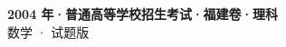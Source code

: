 \documentclass[zihao=-4, a4paper]{ctexart}
\begin{document}
\begin{center}
  {\Large\bfseries 2004 年·普通高等学校招生考试·福建卷·理科}\\[4pt]
  {\large 数学 · 试题版}
\end{center}
\medskip
{}

\end{document}
